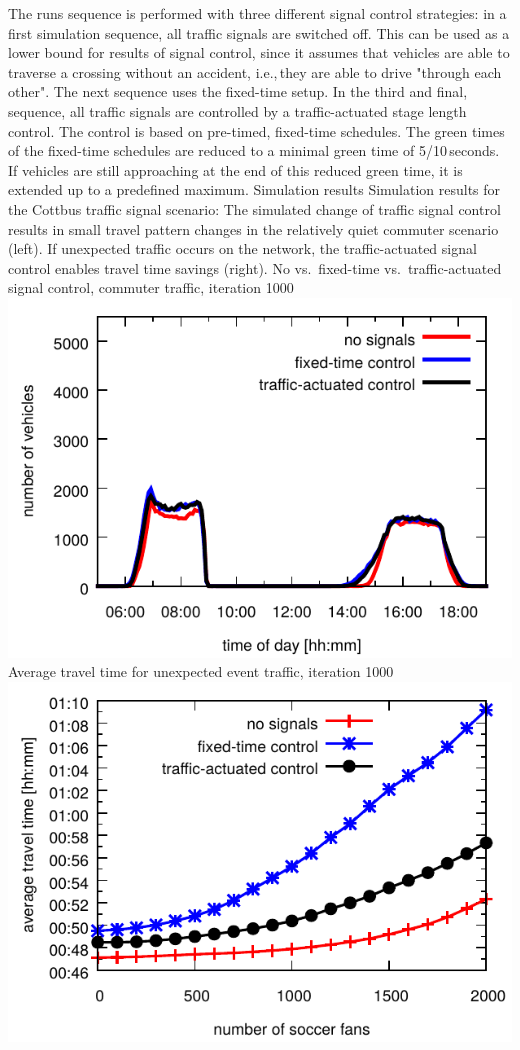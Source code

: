 The runs sequence is performed with three different signal control strategies:
in a first simulation sequence, all traffic signals are switched off. This can be used as a lower bound for results of signal control, since it assumes that vehicles are able to traverse a crossing without an accident, i.e.,\,they are able to drive "through each other". 
The next sequence uses the fixed-time setup. 
In the third and final, sequence, all traffic signals are controlled by a traffic-actuated stage length control. 
The control is based on pre-timed, fixed-time schedules. 
The green times of the fixed-time schedules are reduced to a minimal green time of 5/10\,seconds. 
If vehicles are still approaching at the end of this reduced green time, it is extended up to a predefined maximum. 
%
\createfigure%
{Simulation results}%
{Simulation results for the Cottbus traffic signal scenario: The simulated change of traffic signal control results in small travel pattern changes in the relatively quiet commuter scenario (left). If unexpected traffic occurs on the network, the traffic-actuated signal control enables travel time savings (right).}%
{\label{fig:results_histogram}}
{%
  \createsubfigure%
  {No vs.~fixed-time vs.~traffic-actuated signal control, commuter traffic, iteration 1000}%
	{\includegraphics[width=0.48\linewidth]{extending/figures/signalslanes/leg_histogram_cottbus_1292_1293_1291_it_1000_book.pdf}}
  {\label{fig:commuter_traffic}}%
  \createsubfigure%
	{Average travel time for unexpected event traffic, iteration 1000}
	{\includegraphics[width=0.48\linewidth]{extending/figures/signalslanes/average_travel_time_1220_1222_book.pdf}}
	{\label{fig:unexpected_event}}
}%
{\citet{Grether2014PhD}}


